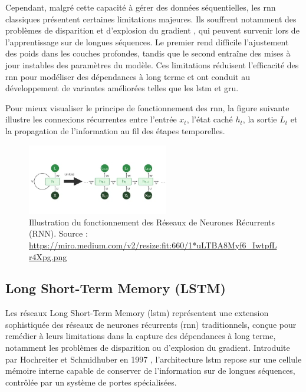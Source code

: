\documentclass[12pt]{report}
\begin{document}
Cependant, malgré cette capacité à gérer des données séquentielles, les \gls{rnn} classiques présentent certaines limitations majeures. Ils souffrent notamment des problèmes de disparition et d’explosion du gradient \cite{bengio1994learning}, qui peuvent survenir lors de l’apprentissage sur de longues séquences. Le premier rend difficile l’ajustement des poids dans les couches profondes, tandis que le second entraîne des mises à jour instables des paramètres du modèle. Ces limitations réduisent l’efficacité des \gls{rnn} pour modéliser des dépendances à long terme et ont conduit au développement de variantes améliorées telles que les \gls{lstm} et \gls{gru}.

Pour mieux visualiser le principe de fonctionnement des \gls{rnn}, la figure suivante illustre les connexions récurrentes entre l’entrée \( x_t \), l’état caché \( h_t \), la sortie \( L_t \) et la propagation de l’information au fil des étapes temporelles.

\begin{figure}[H]
    \centering
    \includegraphics[width=0.55\textwidth]{rnn_image.png}
    \caption{Illustration du fonctionnement des Réseaux de Neurones Récurrents (RNN). Source : \url{https://miro.medium.com/v2/resize:fit:660/1*uLTBA8Myf6_IwtpfLr4Xpg.png}}
    \label{fig:rnn_architecture}
\end{figure}

\subsection{Long Short-Term Memory (LSTM)}

Les réseaux Long Short-Term Memory (\gls{lstm}) représentent une extension sophistiquée des réseaux de neurones récurrents (\gls{rnn}) traditionnels, conçue pour remédier à leurs limitations dans la capture des dépendances à long terme, notamment les problèmes de disparition ou d'explosion du gradient. Introduite par Hochreiter et Schmidhuber en 1997 \cite{hochreiter1997long}, l’architecture \gls{lstm} repose sur une cellule mémoire interne capable de conserver de l’information sur de longues séquences, contrôlée par un système de portes spécialisées.
\end{document}

